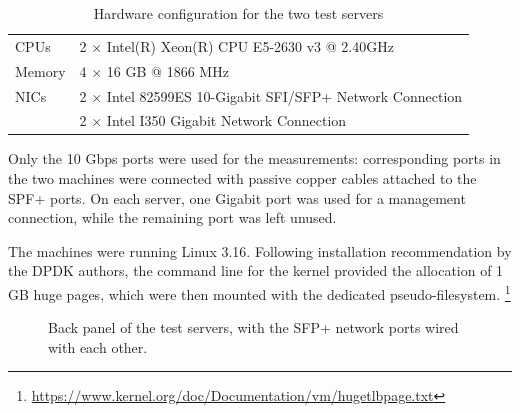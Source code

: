 \documentclass[11pt,a4paper,twoside,titlepage,openany]{book}
\begin{document}
\begin{table}[tb]
  \begin{center}
    \begin{tabular}{ll}
      \toprule
      CPUs   & 2 $\times$ Intel(R) Xeon(R) CPU E5-2630 v3 @ 2.40GHz \\
      Memory & 4 $\times$ 16 GB @ 1866 MHz\\
      NICs   & 2 $\times$ Intel 82599ES 10-Gigabit SFI/SFP+ Network Connection \\
             & 2 $\times$ Intel I350 Gigabit Network Connection \\
      \bottomrule
    \end{tabular}
  \end{center}
  \caption{Hardware configuration for the two test servers}
  \label{tab:test.hw}
\end{table}

Only the 10 Gbps ports were used for the measurements: corresponding ports in the two machines were connected with passive copper cables attached to the SPF+ ports. On each server, one Gigabit port was used for a management connection, while the remaining port was left unused.

The machines were running Linux 3.16. Following installation recommendation by the DPDK authors, the command line for the kernel provided the allocation of 1 GB huge pages, which were then mounted with the dedicated pseudo-filesystem.%
\footnote{\url{https://www.kernel.org/doc/Documentation/vm/hugetlbpage.txt}}

\begin{figure}[htb]
  \begin{center}
    \caption[Back panel of the test servers]{Back panel of the test servers, with the SFP+ network ports wired with each other.}
    \label{fig:test.servers_backpane}
  \end{center}
\end{figure}
\end{document}
